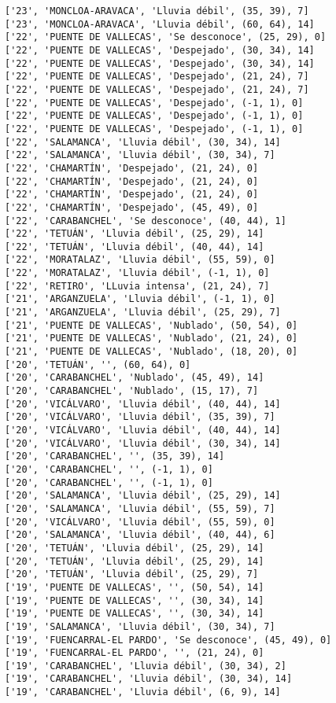 \documentclass[11pt]{article}
\begin{document}
\begin{Verbatim}[commandchars=\\\{\}]
['23', 'MONCLOA-ARAVACA', 'Lluvia débil', (35, 39), 7]
['23', 'MONCLOA-ARAVACA', 'Lluvia débil', (60, 64), 14]
['22', 'PUENTE DE VALLECAS', 'Se desconoce', (25, 29), 0]
['22', 'PUENTE DE VALLECAS', 'Despejado', (30, 34), 14]
['22', 'PUENTE DE VALLECAS', 'Despejado', (30, 34), 14]
['22', 'PUENTE DE VALLECAS', 'Despejado', (21, 24), 7]
['22', 'PUENTE DE VALLECAS', 'Despejado', (21, 24), 7]
['22', 'PUENTE DE VALLECAS', 'Despejado', (-1, 1), 0]
['22', 'PUENTE DE VALLECAS', 'Despejado', (-1, 1), 0]
['22', 'PUENTE DE VALLECAS', 'Despejado', (-1, 1), 0]
['22', 'SALAMANCA', 'Lluvia débil', (30, 34), 14]
['22', 'SALAMANCA', 'Lluvia débil', (30, 34), 7]
['22', 'CHAMARTÍN', 'Despejado', (21, 24), 0]
['22', 'CHAMARTÍN', 'Despejado', (21, 24), 0]
['22', 'CHAMARTÍN', 'Despejado', (21, 24), 0]
['22', 'CHAMARTÍN', 'Despejado', (45, 49), 0]
['22', 'CARABANCHEL', 'Se desconoce', (40, 44), 1]
['22', 'TETUÁN', 'Lluvia débil', (25, 29), 14]
['22', 'TETUÁN', 'Lluvia débil', (40, 44), 14]
['22', 'MORATALAZ', 'Lluvia débil', (55, 59), 0]
['22', 'MORATALAZ', 'Lluvia débil', (-1, 1), 0]
['22', 'RETIRO', 'LLuvia intensa', (21, 24), 7]
['21', 'ARGANZUELA', 'Lluvia débil', (-1, 1), 0]
['21', 'ARGANZUELA', 'Lluvia débil', (25, 29), 7]
['21', 'PUENTE DE VALLECAS', 'Nublado', (50, 54), 0]
['21', 'PUENTE DE VALLECAS', 'Nublado', (21, 24), 0]
['21', 'PUENTE DE VALLECAS', 'Nublado', (18, 20), 0]
['20', 'TETUÁN', '', (60, 64), 0]
['20', 'CARABANCHEL', 'Nublado', (45, 49), 14]
['20', 'CARABANCHEL', 'Nublado', (15, 17), 7]
['20', 'VICÁLVARO', 'Lluvia débil', (40, 44), 14]
['20', 'VICÁLVARO', 'Lluvia débil', (35, 39), 7]
['20', 'VICÁLVARO', 'Lluvia débil', (40, 44), 14]
['20', 'VICÁLVARO', 'Lluvia débil', (30, 34), 14]
['20', 'CARABANCHEL', '', (35, 39), 14]
['20', 'CARABANCHEL', '', (-1, 1), 0]
['20', 'CARABANCHEL', '', (-1, 1), 0]
['20', 'SALAMANCA', 'Lluvia débil', (25, 29), 14]
['20', 'SALAMANCA', 'Lluvia débil', (55, 59), 7]
['20', 'VICÁLVARO', 'Lluvia débil', (55, 59), 0]
['20', 'SALAMANCA', 'Lluvia débil', (40, 44), 6]
['20', 'TETUÁN', 'Lluvia débil', (25, 29), 14]
['20', 'TETUÁN', 'Lluvia débil', (25, 29), 14]
['20', 'TETUÁN', 'Lluvia débil', (25, 29), 7]
['19', 'PUENTE DE VALLECAS', '', (50, 54), 14]
['19', 'PUENTE DE VALLECAS', '', (30, 34), 14]
['19', 'PUENTE DE VALLECAS', '', (30, 34), 14]
['19', 'SALAMANCA', 'Lluvia débil', (30, 34), 7]
['19', 'FUENCARRAL-EL PARDO', 'Se desconoce', (45, 49), 0]
['19', 'FUENCARRAL-EL PARDO', '', (21, 24), 0]
['19', 'CARABANCHEL', 'Lluvia débil', (30, 34), 2]
['19', 'CARABANCHEL', 'Lluvia débil', (30, 34), 14]
['19', 'CARABANCHEL', 'Lluvia débil', (6, 9), 14]

\end{Verbatim}
\end{document}

